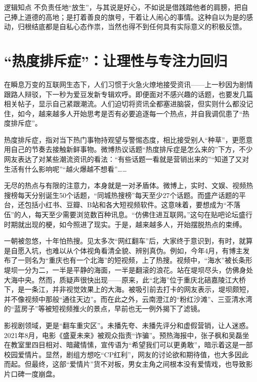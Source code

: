 \begin{quoteBox}{逻辑知点}
不负责任地“放生”，与其说是好心，不如说是借践踏他者的肩膀，把自己捧上道德的高地；是打着善良的旗号，干着让人闹心的事情。这种自以为是的感动，归根结底都是自私心态作祟，当然也得不到任何具有实际意义的积极反馈。
\end{quoteBox}

\clearpage
\section*{“热度排斥症”：让理性与专注力回归}

在瞬息万变的互联网生态下，人们习惯于火急火燎地接受资讯——上一秒因为剧情跟路人辩驳，下一秒为爱豆发新专辑欢呼。即便面对不感兴趣的话题，也要发几篇相关帖子，显示自己紧跟潮流。人们迫切将资讯全都塞进脑袋，但实则什么都没记住，如今，越来越多人开始思考是否有必要追逐每一个热点，并自我调侃患了“热度排斥症”。

热度排斥症，指对当下热门事物持观望与警惕态度，相比接受别人“种草”，更愿意用自己的节奏去接触新鲜事物。微博热议话题“热度排斥症是怎么来的”下方，不少网友表达了对某些潮流资讯的看法：“有些话题一看就是营销出来的”“知道了又对生活有什么影响呢”“越火爆越不想看”……

无尽的热点与有限的注意力，本身就是一对矛盾体。微博上，实时、文娱、视频热搜榜每天分别诞生50个话题，“同城热搜榜”每天至少27个话题。而盛产话题的平台，还包括小红书、豆瓣、B站和各大短视频软件。这意味着，要想成为“不落伍”的人，每天至少需要浏览数百种讯息。“仿佛住进互联网。”这句在贴吧论坛盛行时期就出现的梗，如今照进了现实。于是，越来越多人，开始摆脱热点的束缚。

一朝被忽悠，十年怕热搜。见太多次“网红翻车”后，大家终于意识到，有时，就算是自愿入坑，也难以从个体视角看清全貌、辨别真伪。例如，今年4月，有博主发布了一则名为“重庆也有一个北海”的短视频，上了热搜。视频中，“海水”被长条形堤坝一分为二，一半是平静的海面，一半是翻滚的浪花。站在堤坝尽头，仿佛身处大海中央。然而，质疑声很快出现——原来，此“北海”位于重庆北碚嘉陵江大桥下，是一条江，并非视觉效果上的大海。被吸引前去打卡的网友表示，堤坝颇短，并不像视频中那般“通往天边”。而在此之外，云南澄江的“粉红沙滩”、三亚清水湾的“蓝房子”等被短视频推火的景点，早前也无一例外揭下了滤镜。

影视剧领域，更是“翻车重灾区”。未播先夸、未播先评分和虚假营销，让人迷惑。2021年8月，电影《盛夏未来》被观众指责“诈骗”。预热海报中，张子枫和吴磊坐在教室里四目相对、暗藏情愫，宣传语为“希望我们可以更勇敢”，暗示着这是一部校园爱情片。显然，剧组方想吃“CP红利”，网友的讨论欲和期待值，也大多因此而起。但最终，这部“爱情片”货不对板，男女主角之间根本没有爱情戏，也导致影片口碑一度崩盘。

